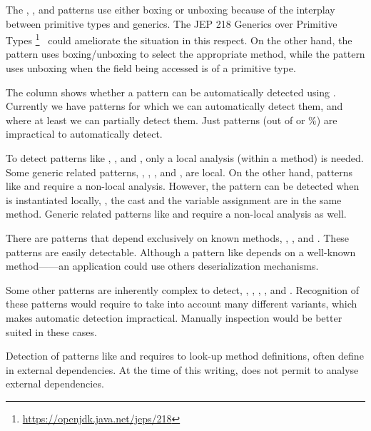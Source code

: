 The
,
, and
patterns use either boxing or unboxing because of the interplay between primitive types and generics.
The JEP 218 Generics over Primitive Types%
\footnote{\url{https://openjdk.java.net/jeps/218}}~\citep{jep218}
could ameliorate the situation in this respect.
On the other hand, 
the  pattern uses boxing/unboxing to select the appropriate method,
while the  pattern
uses unboxing when the field being accessed is of a primitive type.

The \gc{\ql{}} column shows whether a pattern can be automatically detected using \ql{}.
Currently we have \nCmarkCount{} patterns for which we can automatically detect them, and
\nExisCount{} where at least we can partially detect them.
Just \nXmarkCount{} patterns (out of \nPattern{} or \nXmarkPerc{}\%) are impractical to automatically detect.

To detect patterns like
,
, and
,
only a local analysis (within a method) is needed.
Some generic related patterns, \eg{},
,
, and
,
are local.
On the other hand,
patterns like  and
 require a non-local analysis.
However, the  pattern can be detected when
is instantiated locally, \ie{},
the cast and the variable assignment are in the same method.
Generic related patterns like  and  require a non-local analysis as well.

There are patterns that depend exclusively on known methods, \eg{},
, and
.
These patterns are easily detectable.
Although a pattern like  depends on a well-known method------an application could use others deserialization mechanisms.

Some other patterns are inherently complex to detect, \eg{},
,
,
, and
.
Recognition of these patterns would require to take into account many different variants,
which makes automatic detection impractical.
Manually inspection would be better suited in these cases. 

Detection of patterns like  and  requires to look-up method definitions,
often define in external dependencies.
At the time of this writing, \ql{} does not permit to analyse external dependencies.
